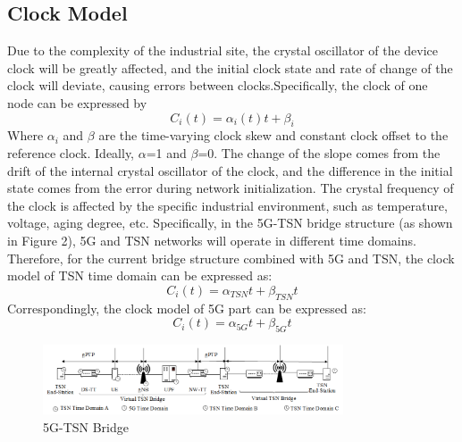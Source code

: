 \documentclass[english]{cccconf}
\begin{document}
\subsection{Clock Model}
	Due to the complexity of the industrial site, the crystal oscillator of the device clock will be greatly affected, and the initial clock state and rate of change of the clock will deviate, causing errors between clocks.Specifically, the clock of one node can be expressed by
\begin{equation}
	C_i(t) = \alpha _i(t)t + \beta _i 
\end{equation}
Where $\alpha_i$ and $\beta$ are the  time-varying clock skew and constant clock offset to the reference clock. Ideally, $\alpha$=1 and $\beta$=0. The change of the slope comes from the drift of the internal crystal oscillator of the clock, and the difference in the initial state comes from the error during network initialization. The crystal frequency of the clock is affected by the specific industrial environment, such as temperature, voltage, aging degree, etc. Specifically, in the 5G-TSN bridge structure (as shown in Figure 2), 5G and TSN networks will operate in different time domains. Therefore, for the current bridge structure combined with 5G and TSN, the clock model of TSN time domain can be expressed as:
\begin{equation}
	C_i(t) = \alpha_{TSN}t + \beta _{TSN}t
\end{equation}
 Correspondingly, the clock model of 5G part can be expressed as:
 \begin{equation}
 	C_i(t) = \alpha_{5G}t + \beta _{5G}t
 \end{equation}
\begin{figure}[htbp]
	\centering
	\setcounter{figure}{1}
	\includegraphics[width=3.5in]{fig12.png}
	\caption{5G-TSN Bridge}
\end{figure}
\end{document}
